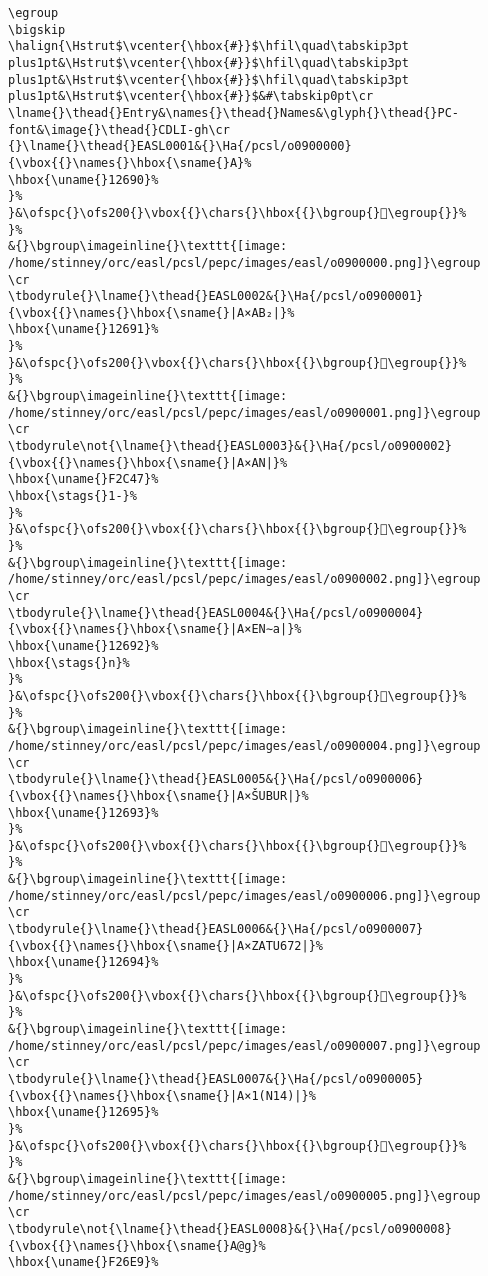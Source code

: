 \begin{verbatim}
\egroup
\bigskip
\halign{\Hstrut$\vcenter{\hbox{#}}$\hfil\quad\tabskip3pt plus1pt&\Hstrut$\vcenter{\hbox{#}}$\hfil\quad\tabskip3pt plus1pt&\Hstrut$\vcenter{\hbox{#}}$\hfil\quad\tabskip3pt plus1pt&\Hstrut$\vcenter{\hbox{#}}$&#\tabskip0pt\cr
\lname{}\thead{}Entry&\names{}\thead{}Names&\glyph{}\thead{}PC-font&\image{}\thead{}CDLI-gh\cr
{}\lname{}\thead{}EASL0001&{}\Ha{/pcsl/o0900000}{\vbox{{}\names{}\hbox{\sname{}A}%
\hbox{\uname{}12690}%
}%
}&\ofspc{}\ofs200{}\vbox{{}\chars{}\hbox{{}\bgroup{}𒚐\egroup{}}%
}%
&{}\bgroup\imageinline{}\texttt{[image: /home/stinney/orc/easl/pcsl/pepc/images/easl/o0900000.png]}\egroup
\cr
\tbodyrule{}\lname{}\thead{}EASL0002&{}\Ha{/pcsl/o0900001}{\vbox{{}\names{}\hbox{\sname{}|A×AB₂|}%
\hbox{\uname{}12691}%
}%
}&\ofspc{}\ofs200{}\vbox{{}\chars{}\hbox{{}\bgroup{}𒚑\egroup{}}%
}%
&{}\bgroup\imageinline{}\texttt{[image: /home/stinney/orc/easl/pcsl/pepc/images/easl/o0900001.png]}\egroup
\cr
\tbodyrule\not{\lname{}\thead{}EASL0003}&{}\Ha{/pcsl/o0900002}{\vbox{{}\names{}\hbox{\sname{}|A×AN|}%
\hbox{\uname{}F2C47}%
\hbox{\stags{}1-}%
}%
}&\ofspc{}\ofs200{}\vbox{{}\chars{}\hbox{{}\bgroup{}󲱇\egroup{}}%
}%
&{}\bgroup\imageinline{}\texttt{[image: /home/stinney/orc/easl/pcsl/pepc/images/easl/o0900002.png]}\egroup
\cr
\tbodyrule{}\lname{}\thead{}EASL0004&{}\Ha{/pcsl/o0900004}{\vbox{{}\names{}\hbox{\sname{}|A×EN∼a|}%
\hbox{\uname{}12692}%
\hbox{\stags{}n}%
}%
}&\ofspc{}\ofs200{}\vbox{{}\chars{}\hbox{{}\bgroup{}𒚒\egroup{}}%
}%
&{}\bgroup\imageinline{}\texttt{[image: /home/stinney/orc/easl/pcsl/pepc/images/easl/o0900004.png]}\egroup
\cr
\tbodyrule{}\lname{}\thead{}EASL0005&{}\Ha{/pcsl/o0900006}{\vbox{{}\names{}\hbox{\sname{}|A×ŠUBUR|}%
\hbox{\uname{}12693}%
}%
}&\ofspc{}\ofs200{}\vbox{{}\chars{}\hbox{{}\bgroup{}𒚓\egroup{}}%
}%
&{}\bgroup\imageinline{}\texttt{[image: /home/stinney/orc/easl/pcsl/pepc/images/easl/o0900006.png]}\egroup
\cr
\tbodyrule{}\lname{}\thead{}EASL0006&{}\Ha{/pcsl/o0900007}{\vbox{{}\names{}\hbox{\sname{}|A×ZATU672|}%
\hbox{\uname{}12694}%
}%
}&\ofspc{}\ofs200{}\vbox{{}\chars{}\hbox{{}\bgroup{}𒚔\egroup{}}%
}%
&{}\bgroup\imageinline{}\texttt{[image: /home/stinney/orc/easl/pcsl/pepc/images/easl/o0900007.png]}\egroup
\cr
\tbodyrule{}\lname{}\thead{}EASL0007&{}\Ha{/pcsl/o0900005}{\vbox{{}\names{}\hbox{\sname{}|A×1(N14)|}%
\hbox{\uname{}12695}%
}%
}&\ofspc{}\ofs200{}\vbox{{}\chars{}\hbox{{}\bgroup{}𒚕\egroup{}}%
}%
&{}\bgroup\imageinline{}\texttt{[image: /home/stinney/orc/easl/pcsl/pepc/images/easl/o0900005.png]}\egroup
\cr
\tbodyrule\not{\lname{}\thead{}EASL0008}&{}\Ha{/pcsl/o0900008}{\vbox{{}\names{}\hbox{\sname{}A@g}%
\hbox{\uname{}F26E9}%

\end{verbatim}
